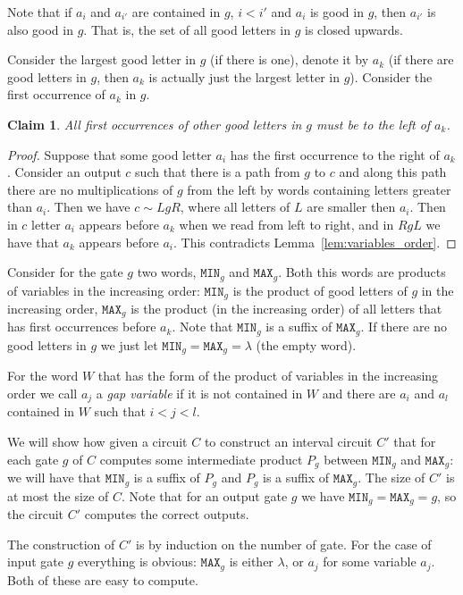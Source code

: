 \documentclass[11pt,letterpaper]{article}
\newtheorem{claim}{Claim}
\newcommand{\mmin}{\texttt{MIN}}
\newcommand{\mmax}{\texttt{MAX}}
\begin{document}
Note that if $a_i$ and $a_{i'}$ are contained in $g$, $i<i'$ and $a_i$ is good in $g$, then $a_{i'}$ is also good in $g$. That is, the set of all good letters in $g$ is closed upwards.

Consider the largest good letter in $g$ (if there is one), denote it by $a_k$ (if there are good letters in $g$, then $a_k$ is actually just the largest letter in $g$). Consider the first occurrence of $a_k$ in $g$.

\begin{claim}
All first occurrences of other good letters in $g$ must be to the left of $a_k$.
\end{claim}

\begin{proof}
Suppose that some good letter $a_i$ has the first occurrence to the right of $a_k$. Consider an output $c$ such that there is a path from $g$ to $c$ and along this path there are no multiplications of $g$ from the left by words containing letters greater than $a_i$. Then we have $c \sim LgR$, where all letters of $L$ are smaller then $a_i$. Then in $c$ letter $a_i$ appears before $a_k$ when we read from left to right, and in $RgL$ we have that $a_k$ appears before $a_i$. This contradicts Lemma~\ref{lem:variables_order}.
\end{proof}

Consider for the gate $g$ two words, $\mmin_g$ and $\mmax_g$. Both this words are products of variables in the increasing order: $\mmin_g$ is the product of good letters of $g$ in the increasing order, $\mmax_g$ is the product (in the increasing order) of all letters that has first occurrences before $a_k$. Note that $\mmin_g$ is a suffix of $\mmax_g$. If there are no good letters in $g$ we just let $\mmin_g=\mmax_g=\lambda$ (the empty word).

For the word $W$ that has the form of the product of variables in the increasing order we call $a_j$ a \emph{gap variable} if it is not contained in $W$ and there are $a_i$ and $a_l$ contained in $W$ such that $i<j<l$.

We will show how given a circuit $C$ to construct an interval circuit $C'$ that for each gate $g$ of $C$ computes some intermediate product $P_g$ between $\mmin_g$ and $\mmax_g$: we will have that $\mmin_g$ is a suffix of $P_g$ and $P_g$ is a suffix of $\mmax_g$. The size of $C'$ is at most the size of $C$.
Note that for an output gate $g$ we have $\mmin_g=\mmax_g=g$, so the circuit $C'$ computes the correct outputs.

The construction of $C'$ is by induction on the number of gate. For the case of input gate $g$ everything is obvious: $\mmax_g$ is either $\lambda$, or $a_j$ for some variable $a_j$. Both of these are easy to compute.
\end{document}
